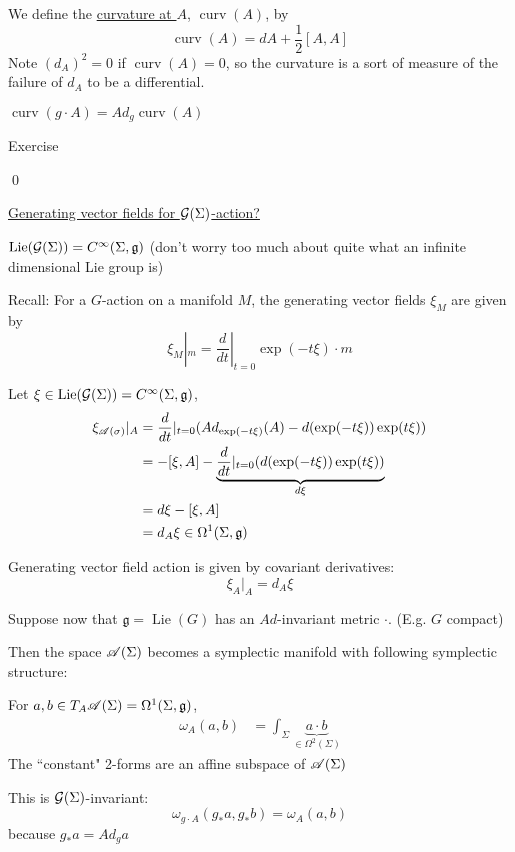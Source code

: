 \documentclass[x11names,reqno,14pt]{extarticle}
\newcommand{\mk}[1]{\mathfrak{#1}}
\newcommand{\g}{\mk{g}}
\newcommand{\dd}[2]{\frac{d#1}{d#2}}
\begin{document}

We define the \underline{curvature at $A$}, $\operatorname{curv}(A)$, by 
\[
\operatorname{curv}(A) = dA + \frac12[A,A]
\]
 Note $(d_A)^2 = 0$ if $\operatorname{curv}(A) = 0$, so the curvature is a sort of measure of the failure of $d_A$ to be a differential. 


\lem

$\operatorname{curv}(g\cdot A) = Ad_g\operatorname{curv}(A)$

\proof

Exercise

\qed

\underline{Generating vector fields for $\mathcal{G}(\Sigma)$-action?}

$\operatorname{Lie}(\mc{G}(\Sigma)) = C^\oo(\Sigma,\g)$ (don't worry too much about quite what an infinite dimensional Lie group is)

Recall: For a $G$-action on a manifold $M$, the generating vector fields $\xi_M$ are given by 
\[
\xi_M|_m = \dd{}{t}|_{t=0}\exp(-t\xi)\cdot m
\]

Let $\xi \in \operatorname{Lie}(\mc{G}(\Sigma)) = C^\oo(\Sigma,\g)$, 
\begin{align*}
\xi_{\ms{A}(\sigma)} |_A & = \dd{}{t}|_{t=0}(Ad_{\exp(-t\xi)}(A) - d(\exp(-t\xi))\exp(t\xi)) \\
& = -[\xi,A] - \underbrace{\dd{}{t}|_{t=0}(d(\exp(-t\xi))\exp(t\xi))}_{d\xi} \\
& = d\xi - [\xi,A] \\
& = d_A\xi\in\Omega^1(\Sigma,\g)
\end{align*}

Generating vector field action is given by covariant derivatives:
\[
\xi_A|_A = d_A\xi
\]

Suppose now that $\g = \operatorname{Lie}(G)$ has an $Ad$-invariant metric $\cdot$. (E.g. $G$ compact)

Then the space $\mathscr{A}(\Sigma)$ becomes a symplectic manifold with following symplectic structure: 

For $a, b \in T_A\ms{A}(\Sigma) = \Omega^1(\Sigma,\g)$, 
\begin{align*}
\omega_A(a,b) & = \int_{\Sigma}\underbrace{a\cdot b}_{\in\Omega^2(\Sigma)}
\end{align*}
The ``constant" 2-forms are an affine subspace of $\mathscr{A}(\Sigma)$

This is $\mathcal{G}(\Sigma)$-invariant:
\[
\omega_{g\cdot A}(g_*a,g_*b) = \omega_A(a,b)
\]
because $g_*a = Ad_ga$

\thm
\end{document}
